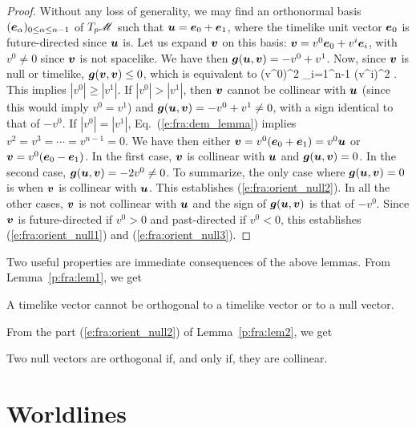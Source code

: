 \begin{proof}
Without any loss of generality,
we may find an orthonormal basis $(\bm{e}_\alpha)_{0\leq \alpha\leq n-1}$ of
$T_p\mathscr{M}$ such that $\bm{u} = \bm{e}_0 + \bm{e}_1$, where the timelike unit vector
$\bm{e}_0$ is future-directed since $\bm{u}$ is. Let us expand $\bm{v}$ on this
basis: $\bm{v} = v^0 \bm{e}_0 + v^i \bm{e}_i$, with $v^0 \not = 0$ since
$\bm{v}$ is not spacelike. We have then
$\bm{g}(\bm{u},\bm{v}) = -v^0 + v^1$. Now, since $\bm{v}$ is null or timelike,
$\bm{g}(\bm{v},\bm{v}) \leq 0$, which is equivalent to
\be \label{e:fra:dem_lemma}
    (v^0)^2 \geq \sum_{i=1}^{n-1} (v^i)^2 .
\ee
This implies $|v^0| \geq |v^1|$.
If $|v^0| > |v^1|$, then $\bm{v}$ cannot be collinear with $\bm{u}$
(since this would imply $v^0 = v^1$)
and
$\bm{g}(\bm{u},\bm{v}) = -v^0 + v^1 \neq 0$, with a sign identical to that of $-v^0$. If $|v^0| = |v^1|$, Eq.~(\ref{e:fra:dem_lemma})
implies $v^2=v^3=\cdots=v^{n-1} = 0$. We have then
either $\bm{v} = v^0 (\bm{e}_0 + \bm{e}_1) = v^0 \bm{u}$ or
$\bm{v} = v^0 (\bm{e}_0 - \bm{e}_1)$. In the first case, $\bm{v}$ is collinear with $\bm{u}$
and $\bm{g}(\bm{u},\bm{v})=0$. In
the second case, $\bm{g}(\bm{u},\bm{v}) = -2 v^0 \neq 0$. To summarize, the
only case where $\bm{g}(\bm{u},\bm{v})=0$ is when $\bm{v}$ is collinear with $\bm{u}$.
This establishes (\ref{e:fra:orient_null2}).
In all the other cases, $\bm{v}$ is not collinear with $\bm{u}$ and the sign of $\bm{g}(\bm{u},\bm{v})$ is that of $-v^0$. Since
$\bm{v}$ is future-directed if $v^0 > 0$
and past-directed if $v^0 < 0$, this establishes (\ref{e:fra:orient_null1})
and (\ref{e:fra:orient_null3}).
\end{proof}

Two useful properties are immediate consequences of the above lemmas.
From Lem\-ma~\ref{p:fra:lem1}, we get

\begin{prop}
\label{p:fra:corol1}
A timelike vector cannot be orthogonal to a timelike vector or to a null vector.
\end{prop}

From the part (\ref{e:fra:orient_null2}) of Lemma~\ref{p:fra:lem2}, we get

\begin{prop}
\label{p:fra:corol2}
Two null vectors are orthogonal if, and only if, they are collinear.
\end{prop}


\section{Worldlines} \label{s:fra:worldlines}

